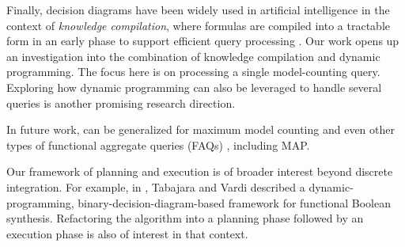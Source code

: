 Finally, decision diagrams have been widely used in artificial intelligence in the context of \emph{knowledge compilation}, where formulas are compiled into a tractable form in an early phase to support efficient query processing \cite{koriche2013knowledge,LM17,darwiche2004new,OD15}.
Our work opens up an investigation into the combination of knowledge compilation and dynamic programming.
The focus here is on processing a single model-counting query.
Exploring how dynamic programming can also be leveraged to handle several queries is another promising research direction.


In future work, \procount{} can be generalized for maximum model counting \cite{fremont2017maximum} and even other types of functional aggregate queries (FAQs) \cite{KNR16}, including MAP.

Our framework of planning and execution is of broader interest beyond discrete integration.
For example, in \cite{tabajara2017factored}, Tabajara and Vardi described a dynamic-programming, binary-decision-diagram-based framework for functional Boolean synthesis.
Refactoring the algorithm into a planning phase followed by an execution phase is also of interest in that context.



